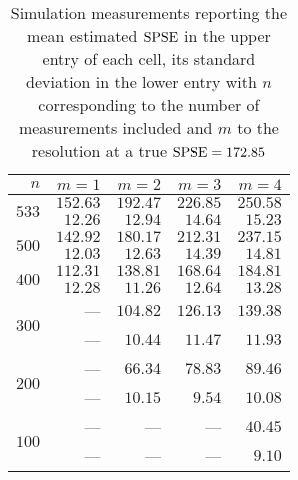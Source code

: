 \begin{table}[htb]
	\center
	\caption{Simulation measurements reporting the mean estimated $\mathrm{SPSE}$ in the upper entry of each cell, its standard deviation in the lower entry with $n$ corresponding to the number of measurements included and $m$ to the resolution at a true $\mathrm{SPSE} = 172.85$}
	\label{tab:sim-res}
	\begin{tabular}{rrrrr}
		\hline
		$n$ & $m=1$ & $m=2$ & $m=3$ & $m=4$ \\
		\hline
		\hline
		\multirow{2}{*}{$533$}
		& $152.63$ & $192.47$ & $226.85$ & $250.58$ \\
		& $12.26$ & $12.94$ & $14.64$ & $15.23$ \\
		\hline
		\multirow{2}{*}{$500$}
		& $142.92$ & $180.17$ & $212.31$ & $237.15$ \\
		& $12.03$ & $12.63$ & $14.39$ & $14.81$ \\
		\hline
		\multirow{2}{*}{$400$}
		& $112.31$ & $138.81$ & $168.64$ & $184.81$ \\
		& $12.28$ & $11.26$ & $12.64$ & $13.28$ \\
		\hline
		\multirow{2}{*}{$300$}
		& --- & $104.82$ & $126.13$ & $139.38$ \\
		& --- & $10.44$ & $11.47$ & $11.93$ \\
		\hline
		\multirow{2}{*}{$200$}
		& --- & $66.34$ & $78.83$ & $89.46$ \\
		& --- & $10.15$ & $9.54$ & $10.08$ \\
		\hline
		\multirow{2}{*}{$100$}
		& --- & --- & --- & $40.45$ \\
		& --- & --- & --- & $9.10$ \\
		\hline
	\end{tabular}
\end{table}
